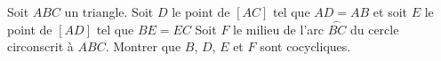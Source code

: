 Soit $ABC$ un triangle. Soit $D$ le point de $[AC]$ tel que $AD = AB$ et soit $E$ le point de $[AD]$ tel que $BE = EC$ Soit $F$ le milieu de l'arc $\overset{\frown}{BC}$ du cercle circonscrit à $ABC$. Montrer que $B$, $D$, $E$ et $F$ sont cocycliques.
